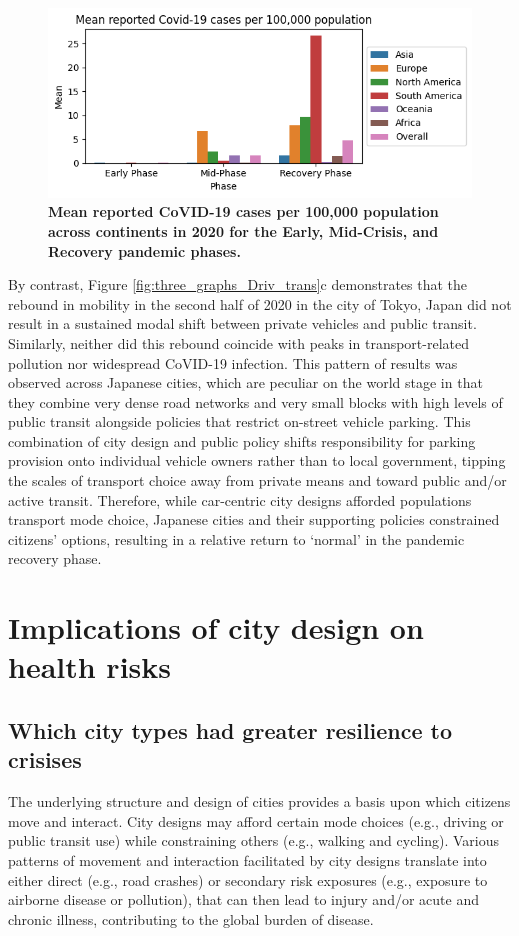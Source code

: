 \documentclass[preprint,10pt]{elsarticle} %
\begin{document}
\begin{figure}
\centering

\includegraphics[trim={0 0 0 0},clip,scale=0.8]{Images/covidCases7Ave_plot.png}
\caption{\bf Mean reported CoVID-19 cases per 100,000 population across  continents in 2020 for the Early, Mid-Crisis, and Recovery pandemic phases.}  
 \label{fig:covidCases7Ave}
\end{figure}

By contrast, Figure \ref{fig:three_graphs_Driv_trans}c demonstrates that the rebound in mobility in the second half of 2020 in the city of Tokyo, Japan did not result in a sustained modal shift between private vehicles and public transit. Similarly, neither did this rebound coincide with peaks in transport-related pollution nor widespread CoVID-19 infection. This pattern of results was observed across Japanese cities, which are peculiar on the world stage in that they combine very dense road networks and very small blocks with high levels of public transit alongside policies that restrict on-street vehicle parking\cite{clements2019socialising}. This combination of city design and public policy shifts responsibility for parking provision onto individual vehicle owners rather than to local government, tipping the scales of transport choice away from private means and toward public and/or active transit. Therefore, while car-centric city designs afforded populations transport mode choice, Japanese cities and their supporting policies constrained citizens' options, resulting in a relative return to `normal' in the pandemic recovery phase.


\section*{\textcolor{OliveGreen}{Implications of city design on health risks}}
\subsection*{Which city types had greater resilience to crisises}
The underlying structure and design of cities provides a basis upon which citizens move and interact. City designs may afford certain mode choices (e.g., driving or public transit use) while constraining others (e.g., walking and cycling). Various patterns of movement and interaction facilitated by city designs translate into either direct (e.g., road crashes) or secondary risk exposures (e.g., exposure to airborne disease or pollution), that can then lead to injury and/or acute and chronic illness, contributing to the global burden of disease.
\end{document}
